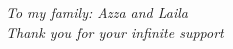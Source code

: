 \label{chap:ack}
\begin{center}
  \begin{large}
    \textit{ \normalsize
    To my family: Azza and Laila\\
  Thank you for your infinite support}
  \end{large}
\end{center}
